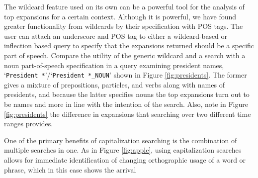 \documentclass[11pt,a4paper]{article}
\newcommand{\query}[1]{\texttt{#1}}
\begin{document}
The wildcard feature used on its own can be a powerful tool for the analysis of top expansions for a certain context.  Although it is powerful, we have found greater functionality from wildcards by their specification with POS tags. The user can attach an underscore and POS tag to either a wildcard-based or inflection based query to specify that the expansions returned should be a specific part of speech. Compare the utility of the generic wildcard and a search with a noun part-of-speech specification in a query examining president names, `\query{President *}'/`\query{President *\_NOUN}' shown in Figure \ref{fig:presidents}. The former gives a mixture of prepositions, particles, and verbs along with names of presidents, and because the latter specifies nouns the top expansions turn out to be names and more in line with the intention of the search. Also, note in Figure \ref{fig:presidents} the difference in expansions that searching over two different time ranges provides.



One of the primary benefits of capitalization searching is the combination of multiple searches in one. As in Figure \ref{fig:apple}, using capitalization searches allows for immediate identification of changing orthographic usage of a word or phrase, which in this case shows the arrival
\end{document}
